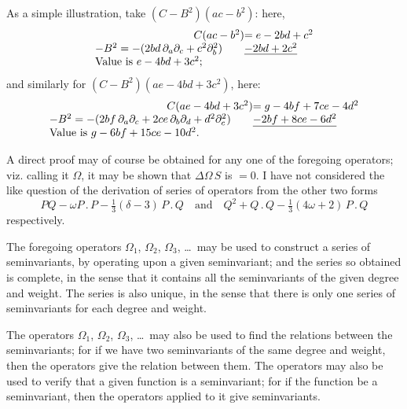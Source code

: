 \documentclass[11pt,a4paper]{book}
\begin{document}
\setcounter{art}{79}
\begin{art}
As a simple illustration, take $(C - B^{2})(ac - b^{2})$: here,
\[
\begin{array}{r@{}l}
C(ac - b^{2}) &= e - 2bd + c^{2} \\
-B^{2} = -(2bd\,\partial_{a}\partial_{c} + c^{2}\partial_{b}^{2})\qquad & \underline{-2bd + 2c^{2}} \\
\multicolumn{2}{l}{\text{Value is } e - 4bd + 3c^{2};}
\end{array}
\]
and similarly for $(C - B^{2})(ae - 4bd + 3c^{2})$, here:
\[
\begin{array}{r@{}l}
C(ae - 4bd + 3c^{2}) &= g - 4bf + 7ce - 4d^{2} \\
-B^{2} = -(2bf\,\partial_{a}\partial_{c} + 2ce\,\partial_{b}\partial_{d} + d^{2}\partial_{c}^{2})\qquad & \underline{-2bf + 8ce - 6d^{2}} \\
\multicolumn{2}{l}{\text{Value is } g - 6bf + 15ce - 10d^{2}.}
\end{array}
\]
\end{art}

\setcounter{art}{80}
\begin{art}
A direct proof may of course be obtained for any one of the foregoing operators; viz. calling it $\Omega$, it may be shown that $\Delta\Omega\,S$ is $= 0$. I have not considered the like question of the derivation of series of operators from the other two forms
\[
PQ - \omega P\,.\,P - \tfrac{1}{3}(\delta - 3)\,P\,.\,Q \quad \text{and} \quad Q^{2} + Q\,.\,Q - \tfrac{1}{3}(4\omega + 2)\,P\,.\,Q
\]
respectively.
\end{art}

\setcounter{art}{81}
\begin{art}
The foregoing operators $\Omega_{1}$, $\Omega_{2}$, $\Omega_{3}$, \ldots\ may be used to construct a series of seminvariants, by operating upon a given seminvariant; and the series so obtained is complete, in the sense that it contains all the seminvariants of the given degree and weight. The series is also unique, in the sense that there is only one series of seminvariants for each degree and weight.
\end{art}

\setcounter{art}{82}
\begin{art}
The operators $\Omega_{1}$, $\Omega_{2}$, $\Omega_{3}$, \ldots\ may also be used to find the relations between the seminvariants; for if we have two seminvariants of the same degree and weight, then the operators give the relation between them. The operators may also be used to verify that a given function is a seminvariant; for if the function be a seminvariant, then the operators applied to it give seminvariants.
\end{art}
\end{document}
